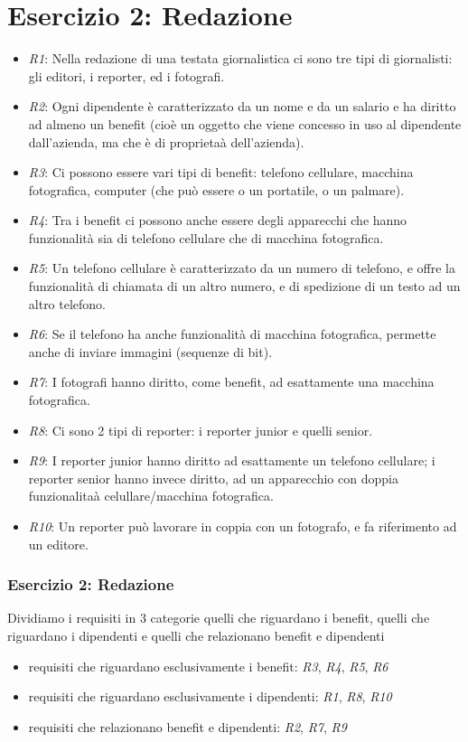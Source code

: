 \documentclass{beamer}
\begin{document}
\section{Esercizio 2: Redazione}
\begin{frame}
\fontsize{9}{11}
\begin{itemize}
\item \emph{R1}: Nella redazione di una testata giornalistica ci sono tre tipi di giornalisti: gli editori, i reporter, ed i fotografi.
\item \emph{R2}: Ogni dipendente \`e caratterizzato da un nome e da un salario e ha diritto ad almeno un benefit (cio\`e un oggetto che viene concesso in uso al dipendente dall'azienda, ma che \`e di proprieta\`a dell'azienda).
\item \emph{R3}: Ci possono essere vari tipi di benefit: telefono cellulare, macchina fotografica, computer (che pu\`o essere o un portatile, o un palmare).
\item \emph{R4}: Tra i benefit ci possono anche essere degli apparecchi che hanno funzionalit\`a sia di telefono cellulare che di macchina fotografica.
\item \emph{R5}: Un telefono cellulare \`e caratterizzato da un numero di telefono, e offre la funzionalit\`a di chiamata di un altro numero, e di spedizione di un testo ad un altro telefono.
\item \emph{R6}: Se il telefono ha anche funzionalit\`a di macchina fotografica, permette anche di inviare immagini (sequenze di bit).
\item \emph{R7}: I fotografi hanno diritto, come benefit, ad esattamente una macchina fotografica.
\item \emph{R8}: Ci sono 2 tipi di reporter: i reporter junior e quelli senior.
\item \emph{R9}: I reporter junior hanno diritto ad esattamente un telefono cellulare; i reporter senior hanno invece diritto, ad un apparecchio con doppia funzionalita\`a celullare/macchina fotografica.
\item \emph{R10}: Un reporter pu\`o lavorare in coppia con un fotografo, e fa riferimento ad un editore.
\end{itemize}
\end{frame}

\begin{frame}
\frametitle{Esercizio 2: Redazione}
Dividiamo i requisiti in 3 categorie quelli che riguardano i benefit, quelli che riguardano i dipendenti e quelli che relazionano benefit e dipendenti
\begin{itemize}
\item requisiti che riguardano esclusivamente i benefit: \emph{R3}, \emph{R4}, \emph{R5}, \emph{R6}
\item requisiti che riguardano esclusivamente i dipendenti: \emph{R1}, \emph{R8}, \emph{R10}
\item requisiti che relazionano benefit e dipendenti: \emph{R2}, \emph{R7}, \emph{R9}
\end{itemize}
\end{frame}
\end{document}

